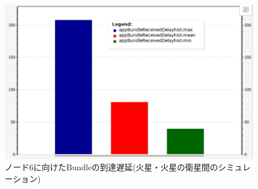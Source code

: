 \begin{figure}[tbh]
    \centering
    \includegraphics[width=0.7\textheight]{img/thesis_sample_delay_hist.pdf}
    \caption{ノード6に向けたBundleの到達遅延(火星・火星の衛星間のシミュレーション)}
    \label{fig:total_delay_histgram_mars_marssat}
    \begin{minipage}{\textwidth}
        \raggedright
    \end{minipage}
\end{figure}